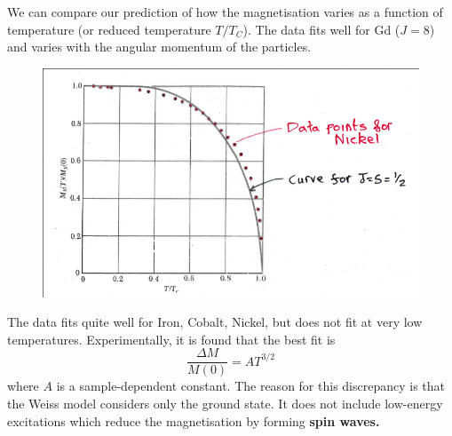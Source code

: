 \documentclass[a4paper, 11pt, normalem]{report}
\begin{document}
We can compare our prediction of how the magnetisation varies as a function of temperature (or reduced temperature $T/T_C$).
The data fits well for Gd ($J=8$) and varies with the angular momentum of the particles. 
\begin{figure}[H]
    \centering
    \includegraphics[scale=0.5]{nick.png}
\end{figure}
The data fits quite well for Iron, Cobalt, Nickel, but does not fit at very low temperatures. 
Experimentally, it is found that the best fit is
\begin{equation}
    \frac{\Delta M}{M(0)} = AT^{3/2}
\end{equation}
where $A$ is a sample-dependent constant. 
The reason for this discrepancy is that the Weiss model considers only the ground state.
It does not include low-energy excitations which reduce the magnetisation by forming \textbf{spin waves.}
\end{document}
